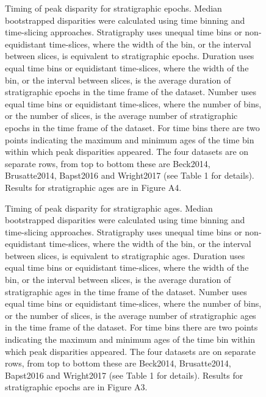 \documentclass[12pt,a4paper]{article}
\begin{document}
   
  \label{table:wilcox2}  

\begin{figure}[!htbp]
    \centering
    \caption[Timing of peak disparity for four example datasets.]
    {Timing of peak disparity for stratigraphic epochs.
    Median bootstrapped disparities were calculated using time binning and time-slicing approaches. 
    Stratigraphy uses unequal time bins or non-equidistant time-slices, where the width of the bin, or the interval between slices, is equivalent to stratigraphic epochs. 
    Duration uses equal time bins or equidistant time-slices, where the width of the bin, or the interval between slices, is the average duration of stratigraphic epochs in the time frame of the dataset. 
    Number uses equal time bins or equidistant time-slices, where the number of bins, or the number of slices, is the average number of stratigraphic epochs in the time frame of the dataset. 
    For time bins there are two points indicating the maximum and minimum ages of the time bin within which peak disparities appeared.
    The four datasets are on separate rows, from top to bottom these are Beck2014, Brusatte2014, Bapst2016 and Wright2017 (see Table 1 for details).
    Results for stratigraphic ages are in Figure A4.}
    \label{figure:peak2}
  \end{figure}

\begin{figure}[!htbp]
    \centering
    \caption[Timing of peak disparity for four example datasets.]
    {Timing of peak disparity for stratigraphic ages.
    Median bootstrapped disparities were calculated using time binning and time-slicing approaches. 
    Stratigraphy uses unequal time bins or non-equidistant time-slices, where the width of the bin, or the interval between slices, is equivalent to stratigraphic ages. 
    Duration uses equal time bins or equidistant time-slices, where the width of the bin, or the interval between slices, is the average duration of stratigraphic ages in the time frame of the dataset. 
    Number uses equal time bins or equidistant time-slices, where the number of bins, or the number of slices, is the average number of stratigraphic ages in the time frame of the dataset. 
    For time bins there are two points indicating the maximum and minimum ages of the time bin within which peak disparities appeared.
    The four datasets are on separate rows, from top to bottom these are Beck2014, Brusatte2014, Bapst2016 and Wright2017 (see Table 1 for details).
    Results for stratigraphic epochs are in Figure A3.}
    \label{figure:peak3}
  \end{figure}
\end{document}
